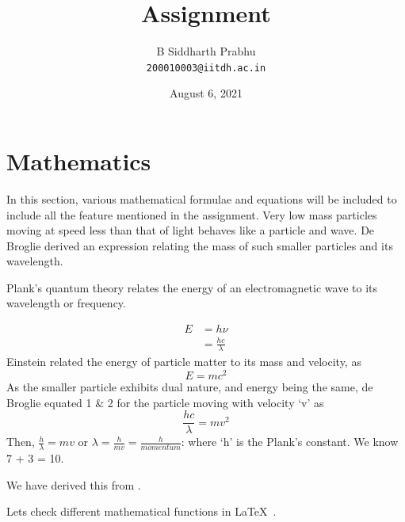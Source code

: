\documentclass{article}
\begin{document}
 
\title{Assignment} 
\author{
B Siddharth Prabhu \\ \texttt{200010003@iitdh.ac.in}
}
\date{August 6, 2021}
\maketitle
\newpage

\tableofcontents
\listoffigures
\listoftables
\newpage

\section{Mathematics}
\label{section-1-math}
In this section, various mathematical formulae and equations will be included to include all the feature mentioned in the assignment. Very low mass particles moving at speed less than that of light behaves like a particle and wave. De Broglie derived an expression relating the mass of such smaller particles and its wavelength.
\par Plank's quantum theory relates the energy of an electromagnetic wave to its wavelength or frequency.

\begin{equation}
\begin{split}
    E & = h\nu \\
    & = \frac{hc}{\lambda} %
\end{split}
\end{equation}
Einstein related the energy of particle matter to its mass and velocity, as
\begin{equation}
    E = mc^2 %
\end{equation}
As the smaller particle exhibits dual nature, and energy being the same, de Broglie equated 1 \& 2 for the particle moving with velocity `v' as
\begin{equation} \nonumber %
    \frac{hc}{\lambda} = mv^2
\end{equation}
Then, $\frac{h}{\lambda} = mv$ 
or $\lambda = \frac{h}{mv} = \frac{h}{momentum}$: where `h' is the Plank's constant. We know 7 + 3 = 10. %

\raggedright{We have derived this from \cite{verma2008concepts}.}

\raggedright{Lets check different mathematical functions in \LaTeX\ .}
\end{document}
